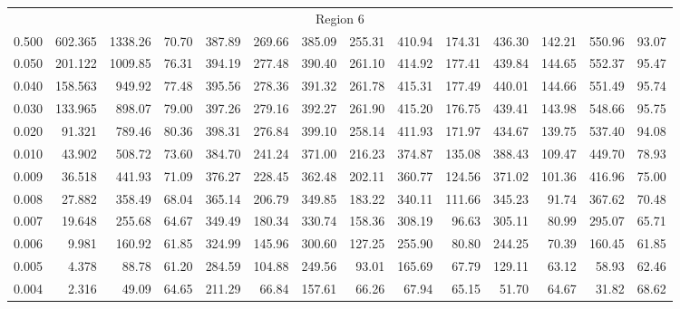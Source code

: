 \begin{tabular}{@{}lrrrrrrrrrrrrr@{}}
\midrule
\multicolumn{14}{c}{Region 6} \\
\cmidrule{1-14}
0.500 & 602.365 & 1338.26 & 70.70 & 387.89 & 269.66 & 385.09 & 255.31 & 410.94 & 174.31 & 436.30 & 142.21 & 550.96 & 93.07 \\
0.050 & 201.122 & 1009.85 & 76.31 & 394.19 & 277.48 & 390.40 & 261.10 & 414.92 & 177.41 & 439.84 & 144.65 & 552.37 & 95.47 \\
0.040 & 158.563 & 949.92 & 77.48 & 395.56 & 278.36 & 391.32 & 261.78 & 415.31 & 177.49 & 440.01 & 144.66 & 551.49 & 95.74 \\
0.030 & 133.965 & 898.07 & 79.00 & 397.26 & 279.16 & 392.27 & 261.90 & 415.20 & 176.75 & 439.41 & 143.98 & 548.66 & 95.75 \\
0.020 & 91.321 & 789.46 & 80.36 & 398.31 & 276.84 & 399.10 & 258.14 & 411.93 & 171.97 & 434.67 & 139.75 & 537.40 & 94.08 \\
0.010 & 43.902 & 508.72 & 73.60 & 384.70 & 241.24 & 371.00 & 216.23 & 374.87 & 135.08 & 388.43 & 109.47 & 449.70 & 78.93 \\
0.009 & 36.518 & 441.93 & 71.09 & 376.27 & 228.45 & 362.48 & 202.11 & 360.77 & 124.56 & 371.02 & 101.36 & 416.96 & 75.00 \\
0.008 & 27.882 & 358.49 & 68.04 & 365.14 & 206.79 & 349.85 & 183.22 & 340.11 & 111.66 & 345.23 & 91.74 & 367.62 & 70.48 \\
0.007 & 19.648 & 255.68 & 64.67 & 349.49 & 180.34 & 330.74 & 158.36 & 308.19 & 96.63 & 305.11 & 80.99 & 295.07 & 65.71 \\
0.006 & 9.981 & 160.92 & 61.85 & 324.99 & 145.96 & 300.60 & 127.25 & 255.90 & 80.80 & 244.25 & 70.39 & 160.45 & 61.85 \\
0.005 & 4.378 & 88.78 & 61.20 & 284.59 & 104.88 & 249.56 & 93.01 & 165.69 & 67.79 & 129.11 & 63.12 & 58.93 & 62.46 \\
0.004 & 2.316 & 49.09 & 64.65 & 211.29 & 66.84 & 157.61 & 66.26 & 67.94 & 65.15 & 51.70 & 64.67 & 31.82 & 68.62 \\


\end{tabular}
